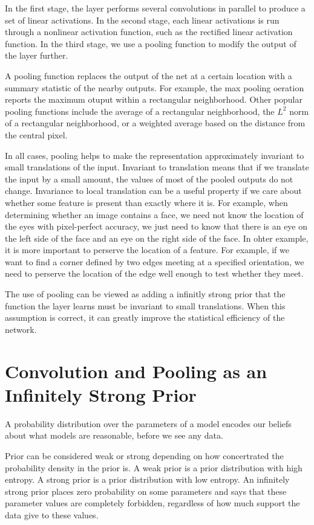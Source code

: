 In the first stage, the layer performs several convolutions in parallel to produce a set of linear activations.
In the second stage, each linear activations is run through a nonlinear activation function, such as the rectified linear activation function.
In the third stage, we use a pooling function to modify the output of the layer further.


A pooling function replaces the output of the net at a certain location with a summary statistic of the nearby outputs.
For example, the max pooling oeration reports the maximum otuput within a rectangular neighborhood.
Other popular pooling functions include the average of a rectangular neighborhood,
the $L^2$ norm of a rectangular neighborhood, or a weighted average based on the distance from the central pixel.


In all cases, pooling helps to make the representation approximately invariant to small translations of the input.
Invariant to translation means that if we translate the input by a small amount, the values of most of the pooled outputs do not change.
Invariance to local translation can be a useful property if we care about whether some feature is present than exactly where it is.
For example, when determining whether an image contains a face, we need not know the location of the eyes with pixel-perfect accuracy,
we just need to know that there is an eye on the left side of the face and an eye on the right side of the face.
In ohter example, it is more important to perserve the location of a feature.
For example, if we want to find a corner defined by two edges meeting at a specified orientation,
we need to perserve the location of the edge well enough to test whether they meet.


The use of pooling can be viewed as adding a infinitly strong prior that the function the layer learns must be invariant to small translations.
When this assumption is correct, it can greatly improve the statistical efficiency of the network.


\section{Convolution and Pooling as an Infinitely Strong Prior}

A probability distribution over the parameters of a model encodes our beliefs about what models are reasonable, before we see any data.

Prior can be considered weak or strong depending on how concertrated the probability density in the prior is.
A weak prior is a prior distribution with high entropy.
A strong prior is a prior distribution with low entropy.
An infinitely strong prior places zero probability on some parameters and says that these parameter values are completely forbidden,
regardless of how much support the data give to these values.


